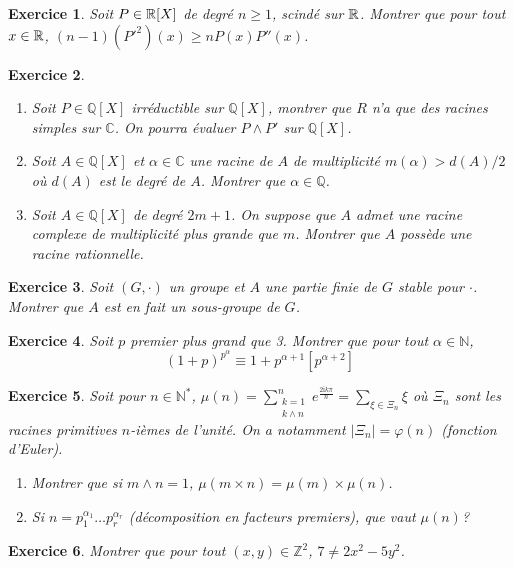 \documentclass[12pt]{article}
\newtheorem{exercise}{Exercice}[section]
\theoremstyle{remark}
\theoremstyle{remark}
\newcommand{\C}{\mathbb{C}} \newcommand{\Q}{\mathbb{Q}}
\newcommand{\N}{\mathbb{N}} \newcommand{\Z}{\mathbb{Z}}
\begin{document}
\begin{exercise}
	Soit $P\in\mathbb{R}[X]$ de degré $n\geqslant1$, scindé sur $\mathbb{R}$. Montrer que pour
	tout $x\in\mathbb{R}$, $(n-1)(P'^{2})(x)\geqslant nP(x)P''(x)$.
\end{exercise}

\begin{exercise}
	\phantom{}
	\begin{enumerate}
		\item
		Soit $P\in\Q[X]$ irréductible sur $\Q[X]$, montrer que $R$ n'a que des
		racines simples sur $\C$. On pourra évaluer $P\wedge P'$ sur $\Q[X]$.
		\item
		Soit $A\in\Q[X]$ et $\alpha\in\C$ une racine de $A$ de multiplicité
		$m(\alpha)>d(A)/2$ où $d(A)$ est le degré de $A$. Montrer que
		$\alpha\in\Q$.
		\item
		Soit $A\in\Q[X]$ de degré $2m+1$. On suppose que $A$ admet une racine
		complexe de multiplicité plus grande que $m$. Montrer que $A$ possède une
		racine rationnelle.
	\end{enumerate}
\end{exercise}

\begin{exercise}
	Soit $(G,\cdot)$ un groupe et $A$ une partie finie de $G$ stable pour $\cdot$.
	Montrer que $A$ est en fait un sous-groupe de $G$.
\end{exercise}

\begin{exercise}
	Soit $p$ premier plus grand que 3. Montrer que pour tout $\alpha\in\N$,
	$$(1+p)^{p^{\alpha}}\equiv 1+p^{\alpha+1}[p^{\alpha+2}]$$
\end{exercise}

\begin{exercise}
	Soit pour $n\in\N^{*}$, $\mu(n)=\sum_{\substack{k=1\\k\wedge
	n}}^{n}e^{\frac{2\mathrm{i}k\pi}{n}}=\sum_{\xi\in\Xi_{n}}\xi$ où $\Xi_{n}$
	sont les racines primitives $n$-ièmes de l'unité. On a notamment
	$\vert\Xi_{n}\vert=\varphi(n)$ (fonction d'Euler).
	\begin{enumerate}
		\item
		Montrer que si $m\wedge n=1$, $\mu(m\times n)=\mu(m)\times\mu(n)$.
		\item
		Si $n=p_{1}^{\alpha_{1}}\dots p_{r}^{\alpha_{r}}$ (décomposition en
		facteurs premiers), que vaut $\mu(n)$?
	\end{enumerate}
\end{exercise}

\begin{exercise}
	Montrer que pour tout $(x,y)\in\Z^{2}$, $7\neq 2x^{2}-5y^{2}$.
\end{exercise}
\end{document}
